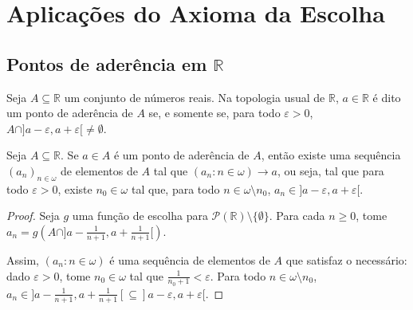 \section{Aplicações do Axioma da Escolha}\label{sec:aplicacoes}

\subsection{Pontos de aderência em \texorpdfstring{$\mathbb R$}{R}}
Seja $A\subseteq \mathbb R$ um conjunto de números reais.
Na topologia usual de $\mathbb R$, $a \in \mathbb R$ é dito um ponto de aderência de $A$ se, e somente se, para todo $\varepsilon>0$, $A\cap ]a-\varepsilon, a+\varepsilon[\neq \emptyset$.

\begin{proposition}[$ZFC^-$]\label{prop:existenciaDePontoDeAderencia}
    Seja $A\subseteq \mathbb R$.
    Se $a \in A$ é um ponto de aderência de $A$, então existe uma sequência $(a_n)_{n\in \omega}$ de elementos de $A$ tal que $(a_n: n \in \omega)\rightarrow a$, ou seja, tal que para todo $\varepsilon>0$, existe $n_0\in \omega$ tal que, para todo $n\in \omega\setminus n_0$, $a_n\in ]a-\varepsilon, a+\varepsilon[$.
\end{proposition}
\begin{proof}
    Seja $g$ uma função de escolha para $\mathcal P(\mathbb R)\setminus\{\emptyset\}$.
    Para cada $n\geq 0$, tome $a_n=g\left(A\cap ]a-\frac{1}{n+1}, a+\frac{1}{n+1}[\right)$.
    
    Assim, $(a_n: n \in \omega)$ é uma sequência de elementos de $A$ que satisfaz o necessário: dado $\varepsilon>0$, tome $n_0\in \omega$ tal que $\frac{1}{n_0+1}<\varepsilon$.
    Para todo $n\in \omega\setminus n_0$, $a_n\in ]a-\frac{1}{n+1}, a+\frac{1}{n+1}[\subseteq ]a-\varepsilon, a+\varepsilon[$.
\end{proof}
